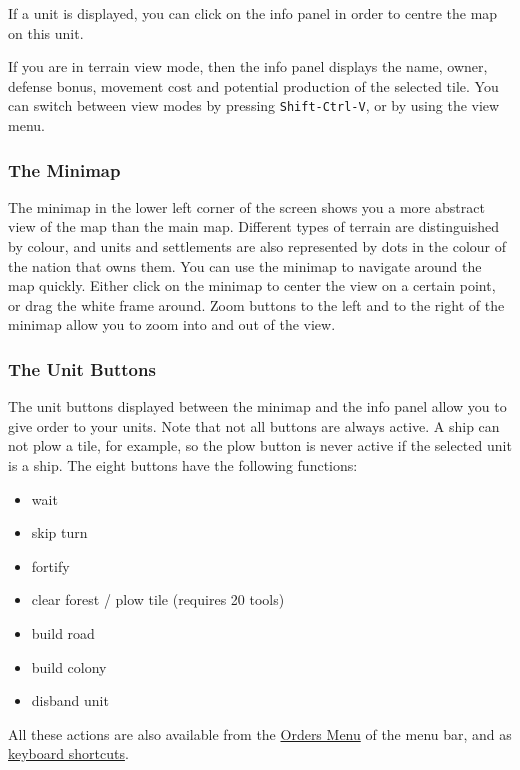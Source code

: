 \documentclass[12pt]{article}
\begin{document}
If a unit is displayed, you can click on the info panel in order to
centre the map on this unit.

If you are in terrain view mode, then the info panel displays the
name, owner, defense bonus, movement cost and potential production of
the selected tile. You can switch between view modes by pressing
\verb$Shift-Ctrl-V$, or by using the view menu.


\hypertarget{minimap}{\subsubsection{The Minimap}}

The minimap in the lower left corner of the screen shows you a more
abstract view of the map than the main map. Different types of terrain
are distinguished by colour, and units and settlements are also
represented by dots in the colour of the nation that owns them. You
can use the minimap to navigate around the map quickly.  Either click
on the minimap to center the view on a certain point, or drag the
white frame around. Zoom buttons to the left and to the right of the
minimap allow you to zoom into and out of the view.


\hypertarget{unit buttons}{\subsubsection{The Unit Buttons}}

The unit buttons displayed between the minimap and the info panel
allow you to give order to your units. Note that not all buttons are
always active. A ship can not plow a tile, for example, so the plow
button is never active if the selected unit is a ship. The eight
buttons have the following functions:

\begin{itemize}
\item wait
\item skip turn
\item fortify
\item clear forest / plow tile (requires 20 tools)
\item build road
\item build colony
\item disband unit
\end{itemize}

All these actions are also available from the \hyperlink{orders
menu}{Orders Menu} of the menu bar, and as \hyperlink{keyboard
shortcuts}{keyboard shortcuts}.
\end{document}
